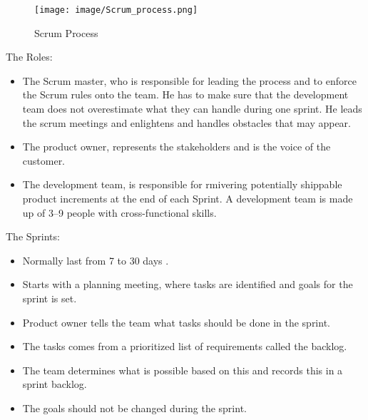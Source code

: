 \begin{figure}
\centering
\texttt{[image: image/Scrum\_process.png]}
\caption{Scrum Process}
\label{figure:scrumprocess}
\end{figure}


The Roles:
\begin{itemize}

\item The Scrum master, who is responsible for leading the process and to enforce the Scrum rules onto the team. He has to make sure that the development team does not overestimate what they can handle during one sprint. He leads the scrum meetings and enlightens and handles obstacles that may appear.

\item The product owner, represents the stakeholders and is the voice of the customer.

\item The development team, is responsible for rmivering potentially shippable product increments at the end of each Sprint. A development team is made up of 3–9 people with cross-functional skills.

\end{itemize}

The Sprints:
\begin{itemize}

\item Normally last from 7 to 30 days .
\item Starts with a planning meeting, where tasks are identified and goals for the sprint is set.
\item Product owner tells the team what tasks should be done in the sprint.
\item The tasks comes from a prioritized list of requirements called the backlog.
\item The team determines what is possible based on this and records this in a sprint backlog.
\item The goals should not be changed during the sprint.

\end{itemize}

